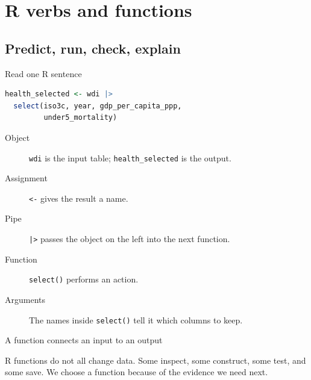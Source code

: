 \section{R verbs and functions}
\subsection{Predict, run, check, explain}

\begin{frame}[fragile]{Read one R sentence}
\begin{lstlisting}[language=R]
health_selected <- wdi |>
  select(iso3c, year, gdp_per_capita_ppp,
         under5_mortality)
\end{lstlisting}

  \begin{description}
    \item[Object] \texttt{wdi} is the input table; \texttt{health\_selected} is the output.
    \item[Assignment] \texttt{<-} gives the result a name.
    \item[Pipe] \texttt{|>} passes the object on the left into the next function.
    \item[Function] \texttt{select()} performs an action.
    \item[Arguments] The names inside \texttt{select()} tell it which columns to keep.
  \end{description}
\end{frame}

\begin{frame}{A function connects an input to an output}
  \begin{center}
  \end{center}

  \vspace{0.8em}
  R functions do not all change data. Some inspect, some construct, some test,
  and some save. We choose a function because of the evidence we need next.
\end{frame}

